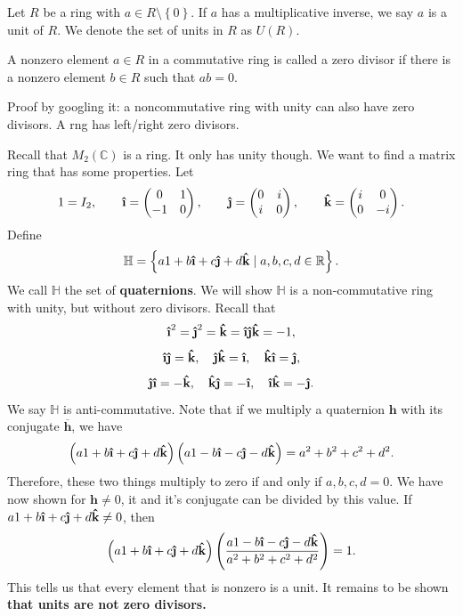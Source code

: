 \begin{definition}[Unit]\label{dfn:Unit}
	Let $R$ be a ring with $a\in R\setminus\left\{ 0 \right\} $. If $a$ has a multiplicative inverse, we say $a$ is a unit of $R$. We denote the set of units in $R$ as $U(R)$.
\end{definition}
\begin{definition}\label{dfn:ZD}
	A nonzero element $a\in R$ in a commutative ring is called a zero divisor if there is a nonzero element $b\in R$ such that $ab=0$.
\end{definition}
\begin{remark}
	Proof by googling it: a noncommutative ring with unity can also have zero divisors. A rng has left/right zero divisors.
\end{remark}
Recall that $M_2(\mathbb{C})$ is a ring. It only has unity though. We want to find a matrix ring that has some properties. Let
\[
	1=I_2,\qquad \hati=\begin{pmatrix}
		0&1\\
		-1&0
	\end{pmatrix},\qquad \hatj=\begin{pmatrix}
		0&i\\
		i&0
	\end{pmatrix} ,\qquad \hatk=\begin{pmatrix}
		i&0\\
		0&-i
	\end{pmatrix}  
.\]
Define
\[
	\mathbb{H}=\left\{ a1+b\hati+c\hatj+d\hatk \mid a,b,c,d\in\mathbb{R} \right\} 
.\]
We call $\mathbb{H}$ the set of \textbf{quaternions}. We will show $\mathbb{H}$ is a non-commutative ring with unity, but without zero divisors. Recall that
\[
	\hati^2=\hatj^2=\hatk=\hati\hatj\hatk=-1,
\]
\[
	\hati\hatj=\hatk,\quad \hatj\hatk=\hati,\quad\hatk\hati=\hatj
,\]
\[
	\hatj\hati=-\hatk,\quad\hatk\hatj=-\hati,\quad\hati\hatk=-\hatj
.\]
We say $\mathbb{H}$ is anti-commutative. Note that if we multiply a quaternion $\mathbf{h}$ with its conjugate $\overline{\mathbf{h}} $, we have
\[
	\left( a1+b\hati+c\hatj+d\hatk \right) \left( a1-b\hati-c\hatj-d\hatk \right) =a^2+b^2+c^2+d^2
.\]
Therefore, these two things multiply to zero if and only if $a,b,c,d=0$. We have now shown for $\mathbf{h}\neq 0$, it and it's conjugate can be divided by this value. If $a1+b\hati+c\hatj+d\hatk\neq 0$, then
\[
	\left( a1+b\hati+c\hatj+d\hatk \right) \left( \frac{a1-b\hati-c\hatj-d\hatk}{a^2+b^2+c^2+d^2} \right) =1
.\]
This tells us that every element that is nonzero is a unit. It remains to be shown \textbf{that units are not zero divisors.}
